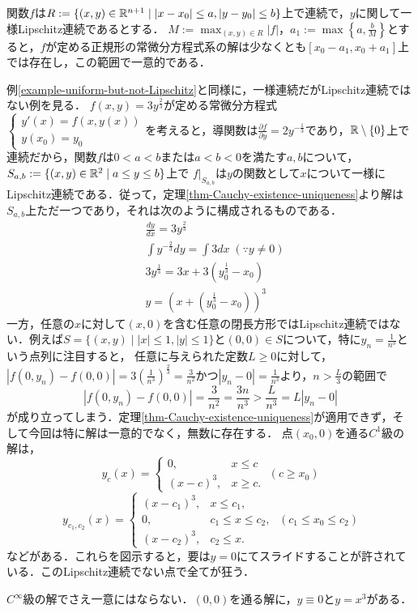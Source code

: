 \documentclass[uplatex,dvipdfmx]{jsreport}
\begin{document}
\begin{theorem}\label{thm-Cauchy-existence-uniqueness-higher-order}
    関数$f$は$R:=\{(x,y)\in\mathbb{R}^{n+1}\mid|x-x_0|\le a,|y-y_0|\le b\}$上で連続で，$y$に関して一様Lipschitz連続であるとする．
    $M:=\max_{(x,y)\in R}|f|$，$a_1:=\max\left\{a,\frac{b}{M}\right\}$とすると，$f$が定める正規形の常微分方程式系の解は少なくとも$[x_0-a_1,x_0+a_1]$上では存在し，この範囲で一意的である．
\end{theorem}

\begin{example}例\ref{example-uniform-but-not-Lipschitz}と同様に，一様連続だがLipschitz連続ではない例を見る．
    $f(x,y)=3y^\frac{2}{3}$が定める常微分方程式$\begin{cases}
        y'(x) = f(x,y(x))\\
        y(x_0) = y_0
    \end{cases}$を考えると，導関数は$\frac{\partial f}{\partial y}=2y^{-\frac{1}{3}}$であり，$\mathbb{R}\setminus\{0\}$上で連続だから，関数$f$は$0<a<b$または$a<b<0$を満たす$a,b$について，$S_{a,b}:=\{(x,y)\in\mathbb{R}^2\mid a\le y\le b\}$上で
    $f|_{S_{a,b}}$は$y$の関数として$x$について一様にLipschitz連続である．従って，定理\ref{thm-Cauchy-existence-uniqueness}より解は$S_{a,b}$上ただ一つであり，それは次のように構成されるものである．
    \begin{align*}
        &\frac{dy}{dx} = 3y^\frac{2}{3}\\
        &\int y^{-\frac{2}{3}}dy = \int 3dx\;(\because y\ne 0)\\
        &3y^\frac{1}{3} = 3x + 3(y_0^\frac{1}{3}-x_0)\\
        &y=(x+(y_0^\frac{1}{3}-x_0))^3
    \end{align*}
    一方，任意の$x$に対して$(x,0)$を含む任意の閉長方形ではLipschitz連続ではない．例えば$S=\{(x,y)\mid|x|\le 1,|y|\le 1\}$と$(0,0)\in S$について，特に$y_n=\frac{1}{n^3}$という点列に注目すると，
    任意に与えられた定数$L\ge 0$に対して，$|f(0,y_n)-f(0,0)|=3\left(\frac{1}{n^3}\right)^\frac{2}{3}=\frac{3}{n^2}$かつ$|y_n-0|=\frac{1}{n^3}$より，$n>\frac{L}{3}$の範囲で
    \[ |f(0,y_n)-f(0,0)|=\frac{3}{n^2}=\frac{3n}{n^3}>\frac{L}{n^3}=L|y_n-0| \]
    が成り立ってしまう．定理\ref{thm-Cauchy-existence-uniqueness}が適用できず，そして今回は特に解は一意的でなく，無数に存在する．
    点$(x_0,0)$を通る$C^1$級の解は，
    \[y_c(x)=\begin{cases}
        0, &x\le c\\
        (x-c)^3, &x\ge c.
    \end{cases}\;(c\ge x_0)\]
    \[y_{c_1,c_2}(x)=\begin{cases}
        (x-c_1)^3, &x\le c_1,\\
        0, &c_1\le x\le c_2,\\
        (x-c_2)^3, &c_2\le x.
    \end{cases}\;(c_1\le x_0\le c_2)\]
    などがある．これらを図示すると，要は$y=0$にてスライドすることが許されている．このLipschitz連続でない点で全てが狂う．
    
    $C^\infty$級の解でさえ一意にはならない．$(0,0)$を通る解に，$y\equiv 0$と$y=x^3$がある．
\end{example}
\end{document}
